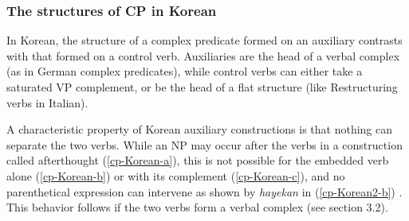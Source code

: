 \documentclass[output=paper]{langsci/langscibook}
\begin{document}
	\subsubsection{The structures of CP in Korean}
	
	In Korean, the structure of a complex predicate formed on an auxiliary contrasts with that formed on a control verb. Auxiliaries are the head of a verbal complex (as in German complex predicates), while control verbs can either take a saturated VP complement, or be the head of a flat structure (like Restructuring verbs in Italian). 
	
	A characteristic property of Korean auxiliary constructions is that nothing can separate the two verbs. While an NP may occur after the verbs in a construction called afterthought (\ref{cp-Korean-a}), this is not possible for the embedded verb alone (\ref{cp-Korean-b}) or with its complement (\ref{cp-Korean-c}), and no parenthetical expression can intervene as shown by \textit{hayekan} in (\ref{cp-Korean2-b}) \citep[examples from][]{CC1998}. This behavior follows if the two verbs form a verbal complex (see section 3.2).
	
\begin{exe}
	\ex  \label{cp-Korean}
	
	\begin{xlist} 
		
		 \label{cp-Korean-a}
		
		 \label{cp-Korean-b}
		
		  \label{cp-Korean-c}
		
		
	\end{xlist}
\end{exe}

	
	\begin{exe}
	\ex  \label{cp-Korean2}
	
	\begin{xlist} 
		
		 \label{cp-Korean2-a}
		
		 \label{cp-Korean2-b}
		
	\end{xlist}
\end{exe}
	
\end{document}
